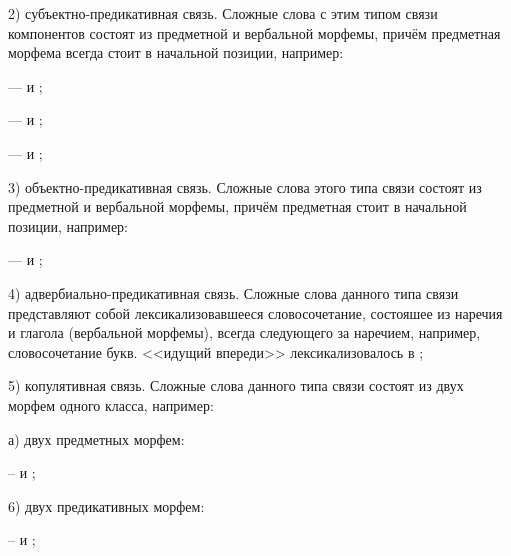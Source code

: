2) субъектно-предикативная связь. Сложные слова с этим типом связи компонентов состоят из предметной и вербальной морфемы, причём предметная морфема всегда стоит в начальной позиции, например:
\begin{prfsample}
    \item {} ---  и ;
    \item {} ---  и ;
    \item {} ---  и ;
\end{prfsample}

3) объектно-предикативная связь. Сложные слова этого типа связи состоят из предметной и вербальной морфемы, причём предметная стоит в начальной позиции, например:
\begin{prfsample}
    \item {} ---  и ;    
\end{prfsample}

4) адвербиально-предикативная связь. Сложные слова данного типа связи представляют собой лексикализовавшееся словосочетание, состояшее из наречия и глагола (вербальной морфемы), всегда следующего за наречием, например, словосочетание  букв. <<идущий впереди>> лексикализовалось в ;

5) копулятивная связь. Сложные слова данного типа связи состоят из двух морфем одного класса, например:

а) двух предметных морфем:
\begin{prfsample}
    \item {} --  и ; 
\end{prfsample}

6)	двух предикативных морфем:
\begin{prfsample}
    \item {} --  и ;
\end{prfsample}

